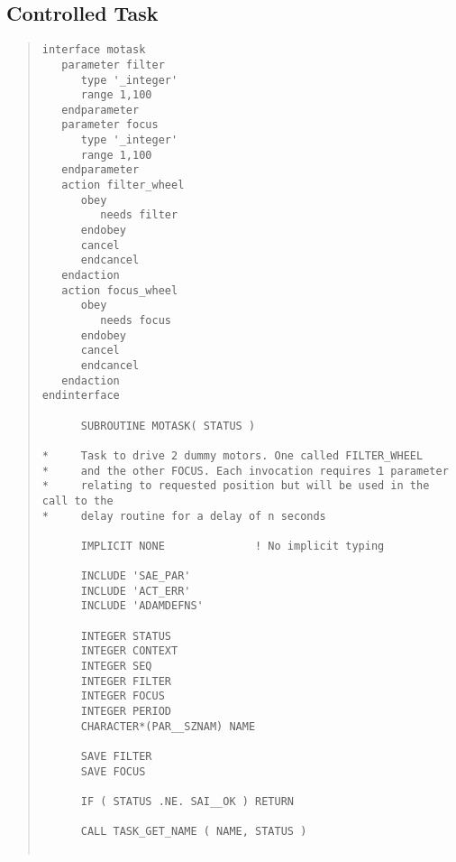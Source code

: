 \subsection{Controlled Task}
\small \begin{quote} \begin{verbatim}
interface motask
   parameter filter
      type '_integer'
      range 1,100
   endparameter
   parameter focus
      type '_integer'
      range 1,100
   endparameter
   action filter_wheel
      obey
         needs filter
      endobey
      cancel
      endcancel
   endaction
   action focus_wheel
      obey
         needs focus
      endobey
      cancel
      endcancel
   endaction
endinterface

      SUBROUTINE MOTASK( STATUS )

*     Task to drive 2 dummy motors. One called FILTER_WHEEL
*     and the other FOCUS. Each invocation requires 1 parameter
*     relating to requested position but will be used in the call to the
*     delay routine for a delay of n seconds

      IMPLICIT NONE              ! No implicit typing

      INCLUDE 'SAE_PAR'  
      INCLUDE 'ACT_ERR'  
      INCLUDE 'ADAMDEFNS'

      INTEGER STATUS
      INTEGER CONTEXT
      INTEGER SEQ
      INTEGER FILTER
      INTEGER FOCUS
      INTEGER PERIOD
      CHARACTER*(PAR__SZNAM) NAME

      SAVE FILTER
      SAVE FOCUS

      IF ( STATUS .NE. SAI__OK ) RETURN

      CALL TASK_GET_NAME ( NAME, STATUS )


\end{verbatim}
\end{quote}
